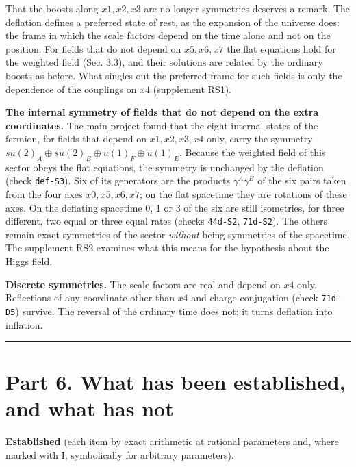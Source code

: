 \documentclass[
  10pt,
]{article}
\begin{document}
That the boosts along \(x1,x2,x3\) are no longer symmetries deserves a
remark. The deflation defines a preferred state of rest, as the
expansion of the universe does: the frame in which the scale factors
depend on the time alone and not on the position. For fields that do not
depend on \(x5,x6,x7\) the flat equations hold for the weighted field
(Sec. 3.3), and their solutions are related by the ordinary boosts as
before. What singles out the preferred frame for such fields is only the
dependence of the couplings on \(x4\) (supplement RS1).

\textbf{The internal symmetry of fields that do not depend on the extra
coordinates.} The main project found that the eight internal states of
the fermion, for fields that depend on \(x1,x2,x3,x4\) only, carry the
symmetry \(su(2)_A\oplus su(2)_B\oplus u(1)_F\oplus u(1)_E\). Because
the weighted field of this sector obeys the flat equations, the symmetry
is unchanged by the deflation (check \texttt{def-S3}). Six of its
generators are the products \(\gamma^A\gamma^B\) of the six pairs taken
from the four axes \(x0,x5,x6,x7\); on the flat spacetime they are
rotations of these axes. On the deflating spacetime 0, 1 or 3 of the six
are still isometries, for three different, two equal or three equal
rates (checks \texttt{44d-S2}, \texttt{71d-S2}). The others remain exact
symmetries of the sector \emph{without} being symmetries of the
spacetime. The supplement RS2 examines what this means for the
hypothesis about the Higgs field.

\textbf{Discrete symmetries.} The scale factors are real and depend on
\(x4\) only. Reflections of any coordinate other than \(x4\) and charge
conjugation (check \texttt{71d-D5}) survive. The reversal of the
ordinary time does not: it turns deflation into inflation.

\begin{center}\rule{0.5\linewidth}{0.5pt}\end{center}

\hypertarget{part-6.-what-has-been-established-and-what-has-not}{%
\section{Part 6. What has been established, and what has
not}\label{part-6.-what-has-been-established-and-what-has-not}}

\textbf{Established} (each item by exact arithmetic at rational
parameters and, where marked with I, symbolically for arbitrary
parameters).
\end{document}
